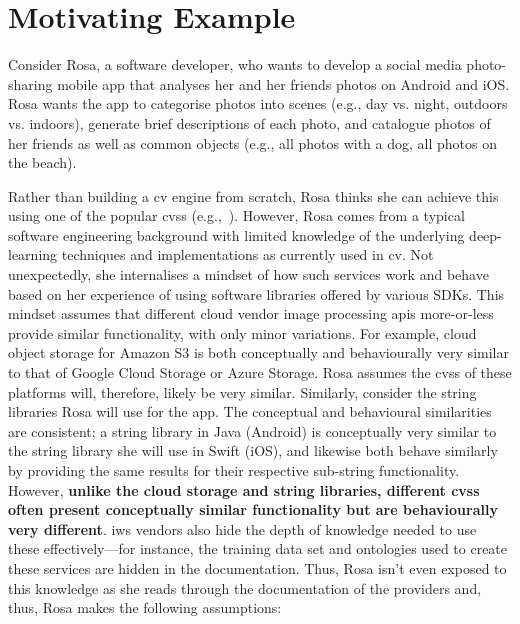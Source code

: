 \section{Motivating Example}
\label{icsme2019:sec:motivating-example}

Consider Rosa, a software developer, who wants to develop a social media photo-sharing mobile app that analyses her and her friends photos on Android and iOS. Rosa wants the app to categorise photos into scenes (e.g., day vs. night, outdoors vs. indoors), generate brief descriptions of each photo, and catalogue photos of her friends as well as common objects (e.g., all photos with a dog, all photos on the beach).

Rather than building a \gls{cv} engine from scratch, Rosa thinks she can achieve this using one of the popular \glspl{cvs} (e.g.,~). However, Rosa comes from a typical software engineering background with limited knowledge of the underlying deep-learning techniques and implementations as currently used in \gls{cv}. Not unexpectedly, she internalises a mindset of how such services work and behave based on her experience of using software libraries offered by various SDKs. This mindset assumes that different cloud vendor image processing \glspl{api} more-or-less provide similar functionality, with only minor variations. For example, cloud object storage for Amazon S3 is both conceptually and behaviourally very similar to that of Google Cloud Storage or Azure Storage. Rosa assumes the \glspl{cvs} of these platforms will, therefore, likely be very similar. Similarly, consider the string libraries Rosa will use for the app. The conceptual and behavioural similarities are consistent; a string library in Java (Android) is conceptually very similar to the string library she will use in Swift (iOS), and likewise both behave similarly by providing the same results for their respective sub-string functionality. However, \textbf{unlike the cloud storage and string libraries, different \glspl{cvs} often present conceptually similar functionality but are behaviourally very different}. \gls{iws} vendors also hide the depth of knowledge needed to use these effectively---for instance, the training data set and ontologies used to create these services are hidden in the documentation. Thus, Rosa isn't even exposed to this knowledge as she reads through the documentation of the providers and, thus, Rosa makes the following assumptions:


